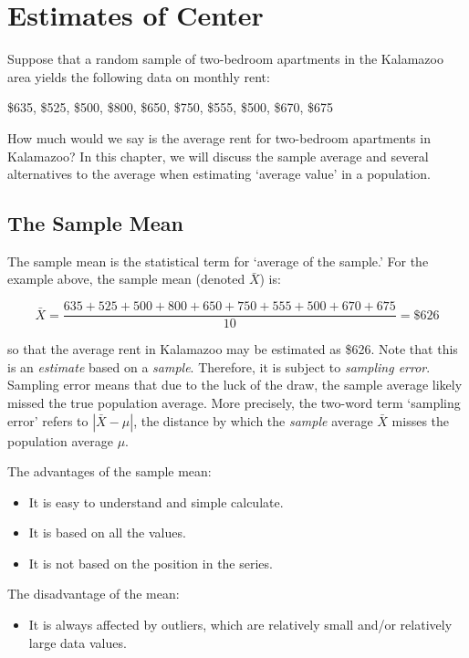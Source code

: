 \documentclass[11pt, chapterprefix=true]{scrbook}\usepackage[]{graphicx}\usepackage[]{color}
\begin{document}
\section{Estimates of Center}

Suppose that a random sample of two-bedroom apartments in the Kalamazoo area yields the following data on monthly rent:

\$635, \$525, \$500, \$800, \$650, \$750, \$555, \$500, \$670, \$675

How much would we say is the average rent for two-bedroom apartments in Kalamazoo?  In this chapter, we will discuss the sample average and several alternatives to the average when estimating `average value' in a population.

\subsection{The Sample Mean}

The sample mean is the statistical term for `average of the sample.'  For the example above, the sample mean (denoted $\bar{X}$) is:

$$ \bar{X} = \frac{635+525+500+800+650+750+555+500+670+675}{10} = \$626 $$

so that the average rent in Kalamazoo may be estimated as \$626.  Note that this is an \textit{estimate} based on a \textit{sample}.  Therefore, it is subject to \textit{sampling error}.   Sampling error means that due to the luck of the draw, the sample average likely missed the true population average.  More precisely, the two-word term `sampling error' refers to $| \bar{X} - \mu |$,  the distance by which the \textit{sample} average $\bar{X}$  misses the population average  $\mu$.

The advantages of the sample mean:

\begin{itemize}
\item It is easy to understand and simple calculate.
\item It is based on all the values.
\item It is not based on the position in the series.
\end{itemize}

The disadvantage of the mean:

\begin{itemize}
\item It is always affected by outliers, which are relatively small and/or relatively large data values.
\end{itemize}
\end{document}
